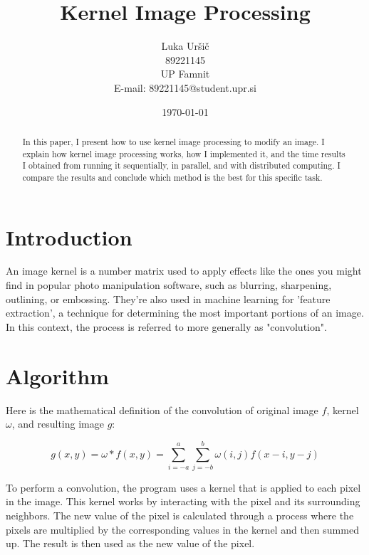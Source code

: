 \documentclass{article}
\title{Kernel Image Processing}
\author{Luka Uršič \\ 89221145 \\ UP Famnit \\ E-mail: 89221145@student.upr.si}
\date{\today}
\begin{document}
\maketitle
\thispagestyle{empty}

\begin{abstract}
    In this paper, I present how to use kernel image processing to modify an image. I explain how kernel image processing works, how I implemented it, and the time results I obtained from running it sequentially, in parallel, and with distributed computing. I compare the results and conclude which method is the best for this specific task.
\end{abstract}

\begin{multicols}{2}

    \section{Introduction}
    An image kernel is a number matrix used to apply effects like the ones you might find in popular photo manipulation software, such as blurring, sharpening, outlining, or embossing. They're also used in machine learning for 'feature extraction', a technique for determining the most important portions of an image. In this context, the process is referred to more generally as "convolution".

    \cite{setosa}

    \section{Algorithm}

    Here is the mathematical definition of the convolution of original image $f$, kernel $\omega$, and resulting image $g$:

    \begin{equation}
        g(x, y) = \omega * f(x, y) = \sum_{i=-a}^{a} \sum_{j=-b}^{b} \omega(i, j) f(x-i, y-j)
    \end{equation}

    \cite{wikipedia}

    \vfill

    To perform a convolution, the program uses a kernel that is applied to each pixel in the image. This kernel works by interacting with the pixel and its surrounding neighbors. The new value of the pixel is calculated through a process where the pixels are multiplied by the corresponding values in the kernel and then summed up. The result is then used as the new value of the pixel.


\end{multicols}
\end{document}
